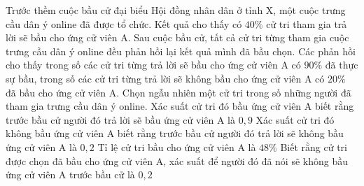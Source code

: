 \begin{ex}%
	Trước thềm cuộc bầu cử đại biểu Hội đồng nhân dân ở tỉnh X, một cuộc trưng cầu dân ý online đã được tổ chức. Kết quả cho thấy có $40\%$ cử tri tham gia trả lời sẽ bầu cho ứng cử viên A. Sau cuộc bầu cử, tất cả cử tri từng tham gia cuộc trưng cầu dân ý online đều phản hồi lại kết quả mình đã bầu chọn. Các phản hồi cho thấy trong số các cử tri từng trả lời sẽ bầu cho ứng cử viên A có $90\%$ đã thực sự bầu, trong số các cử tri từng trả lời sẽ không bầu cho ứng cử viên A có $20\%$ đã bầu cho ứng cử viên A. Chọn ngẫu nhiên một cử tri trong số những người đã tham gia trưng cầu dân ý online.
	\choiceTF
		{\True Xác suất cử tri đó bầu ứng cử viên A biết rằng trước bầu cử người đó trả lời sẽ bầu ứng cử viên A là $0{,}9$}
		{Xác suất cử tri đó không bầu ứng cử viên A biết rằng trước bầu cử người đó trả lời sẽ không bầu ứng cử viên A là $0{,}2$}
		{\True Tỉ lệ cử tri bầu cho ứng cử viên A là $48\%$}
		{Biết rằng cử tri được chọn đã bầu cho ứng cử viên A, xác suất để người đó đã nói sẽ không bầu ứng cử viên A trước bầu cử là $0{,}2$}
\end{ex}

